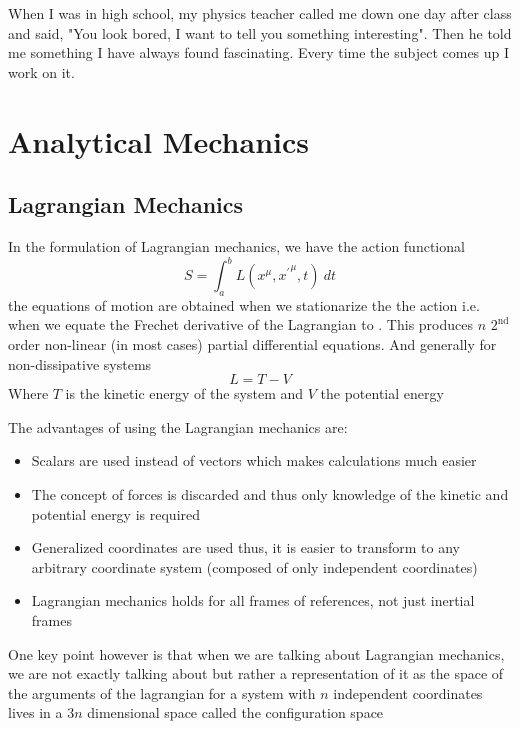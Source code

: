 \begin{savequote}[45mm]
When I was in high school, my physics teacher called me down one day after
class and said, "You look bored, I want to tell you something interesting".
Then he told me something I have always found fascinating. Every time
the subject comes up I work on it.  
\end{savequote}
\chapter{Analytical Mechanics}
\label{ch:method}
\section{Lagrangian Mechanics}
\begin{tcolorbox}
In the formulation of Lagrangian mechanics, we have the action functional
\begin{equation}
    S = \int^{b}_{a} L(x^{\mu}, {{x}^{'}}^{\mu}, t) \ dt
\end{equation}
the equations of motion are obtained when we stationarize the the action i.e. when we equate the Frechet derivative of the Lagrangian to . This produces $n$ $2^{\text{nd}}$ order non-linear (in most cases) partial differential equations. And generally for non-dissipative systems
\begin{equation}
    L = T - V
\end{equation}
Where $T$ is the kinetic energy of the system and $V$ the potential energy
\end{tcolorbox}
The advantages of using the Lagrangian mechanics are:
\begin{itemize}
    \item Scalars are used instead of vectors which makes calculations much easier
    \item The concept of forces is discarded and thus only knowledge of the kinetic and potential energy is required 
    \item Generalized coordinates are used thus, it is easier to transform to any arbitrary coordinate system (composed of only independent coordinates)
    \item Lagrangian mechanics holds for all frames of references, not just inertial frames
\end{itemize}
One key point however is that when we are talking about Lagrangian mechanics, we are not exactly talking about but rather a representation of it as the space of the arguments of the lagrangian for a system with $n$ independent coordinates lives in a $3n$ dimensional space called the configuration space
